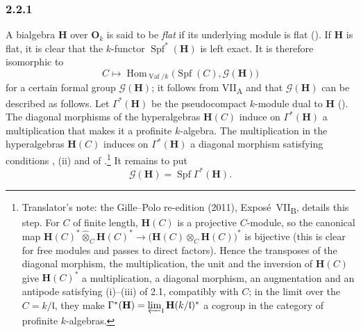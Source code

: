 
\subsubsection*{2.2.1}
\label{sga3:VIIB:2.2.1}

A bialgebra \(\mathbf H\) over \(\mathbf O_k\) is said to be
\emph{flat} if its underlying module is flat
\textup{()}. If \(\mathbf H\) is flat, it is clear that the
\(k\)-functor \(\operatorname{Spf}^*(\mathbf H)\) is left exact. It is
therefore isomorphic to
\[
  C\longmapsto
  \operatorname{Hom}_{\operatorname{Vaf}/k}
    \bigl(\operatorname{Spf}(C),\mathscr G(\mathbf H)\bigr)
\]
for a certain formal group \(\mathscr G(\mathbf H)\); it follows from
VII\textsubscript{A}  and  that
\(\mathscr G(\mathbf H)\) can be described as follows. Let
\(\Gamma^*(\mathbf H)\) be the pseudocompact \(k\)-module dual to
\(\mathbf H\) \textup{()}. The diagonal morphisms of the
hyperalgebras \(\mathbf H(C)\) induce on \(\Gamma^*(\mathbf H)\) a
multiplication that makes it a profinite \(k\)-algebra. The
multiplication in the hyperalgebras \(\mathbf H(C)\) induces on
\(\Gamma^*(\mathbf H)\) a diagonal morphism satisfying conditions
\textup{}, \textup{(ii)} and \textup{} of .\footnote{Translator's note: the Gille--Polo re-edition (2011),
Exposé~VII\textsubscript{B}, details this step. For \(C\) of finite length,
\(\mathbf H(C)\) is a projective \(C\)-module, so the canonical map
\(\mathbf H(C)^*\widehat\otimes_C\mathbf H(C)^*\to
\bigl(\mathbf H(C)\otimes_C\mathbf H(C)\bigr)^*\) is bijective (this is clear
for free modules and passes to direct factors). Hence the transposes of the
diagonal morphism, the multiplication, the unit and the inversion of
\(\mathbf H(C)\) give \(\mathbf H(C)^*\) a multiplication, a diagonal
morphism, an augmentation and an antipode satisfying \textup{(i)--(iii)} of
2.1, compatibly with \(C\); in the limit over the \(C=k/\mathfrak l\), they
make \(\Gamma^*(\mathbf H)=\varprojlim_{\mathfrak l}\mathbf H(k/\mathfrak l)^*\)
a cogroup in the category of profinite \(k\)-algebras.} It
remains to put
\[
  \mathscr G(\mathbf H)=\operatorname{Spf}\Gamma^*(\mathbf H).
\]

